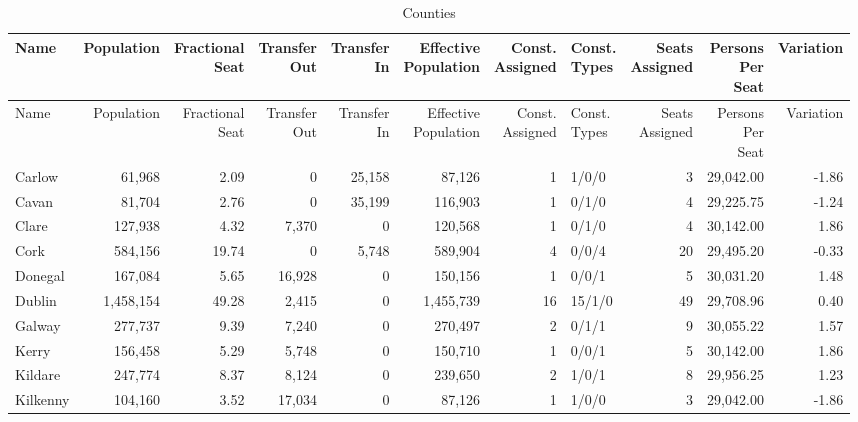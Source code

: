 \documentclass[a4paper]{article}
\begin{document}
\begin{longtable}{lrrrrrrlrrr}
\caption{Counties}
\\ \toprule
Name &Population &\shortstack{Fractional\\Seat} &\shortstack{Transfer\\Out} &\shortstack{Transfer\\In} &\shortstack{Effective\\Population} &\shortstack{Const.\\Assigned} &\shortstack{Const.\\Types} &\shortstack{Seats\\Assigned} &\shortstack{Persons\\Per\\Seat} &Variation \\ \midrule
\endfirsthead
\toprule
Name &Population &\shortstack{Fractional\\Seat} &\shortstack{Transfer\\Out} &\shortstack{Transfer\\In} &\shortstack{Effective\\Population} &\shortstack{Const.\\Assigned} &\shortstack{Const.\\Types} &\shortstack{Seats\\Assigned} &\shortstack{Persons\\Per\\Seat} &Variation \\ \midrule
\endhead
\bottomrule
\endfoot
Carlow&61,968& 2.09&0&25,158&87,126&1&1/0/0&3&29,042.00&-1.86\\ 
Cavan&81,704& 2.76&0&35,199&116,903&1&0/1/0&4&29,225.75&-1.24\\ 
Clare&127,938& 4.32&7,370&0&120,568&1&0/1/0&4&30,142.00& 1.86\\ 
Cork&584,156&19.74&0&5,748&589,904&4&0/0/4&20&29,495.20&-0.33\\ 
Donegal&167,084& 5.65&16,928&0&150,156&1&0/0/1&5&30,031.20& 1.48\\ 
Dublin&1,458,154&49.28&2,415&0&1,455,739&16&15/1/0&49&29,708.96& 0.40\\ 
Galway&277,737& 9.39&7,240&0&270,497&2&0/1/1&9&30,055.22& 1.57\\ 
Kerry&156,458& 5.29&5,748&0&150,710&1&0/0/1&5&30,142.00& 1.86\\ 
Kildare&247,774& 8.37&8,124&0&239,650&2&1/0/1&8&29,956.25& 1.23\\ 
Kilkenny&104,160& 3.52&17,034&0&87,126&1&1/0/0&3&29,042.00&-1.86\\ 

\end{longtable}
\end{document}
